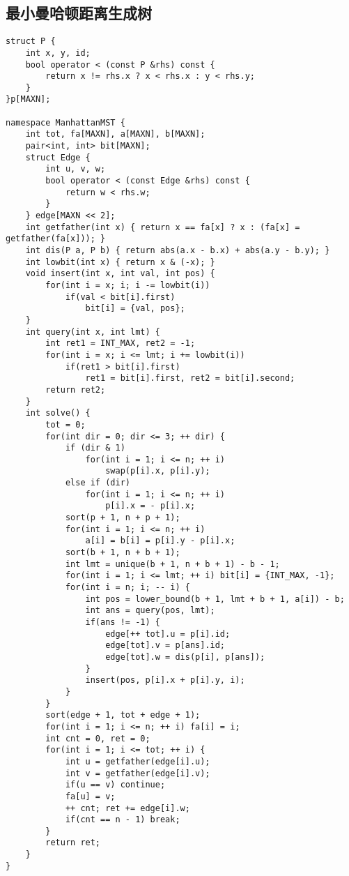 \subsection{最小曼哈顿距离生成树}

\begin{verbatim}
struct P {
    int x, y, id;
    bool operator < (const P &rhs) const {
        return x != rhs.x ? x < rhs.x : y < rhs.y;
    }
}p[MAXN];

namespace ManhattanMST {
    int tot, fa[MAXN], a[MAXN], b[MAXN];
    pair<int, int> bit[MAXN];
    struct Edge {
        int u, v, w;
        bool operator < (const Edge &rhs) const {
            return w < rhs.w;
        }
    } edge[MAXN << 2];
    int getfather(int x) { return x == fa[x] ? x : (fa[x] = getfather(fa[x])); }
    int dis(P a, P b) { return abs(a.x - b.x) + abs(a.y - b.y); }
    int lowbit(int x) { return x & (-x); }
    void insert(int x, int val, int pos) {
        for(int i = x; i; i -= lowbit(i))
            if(val < bit[i].first)
                bit[i] = {val, pos};
    }
    int query(int x, int lmt) {
        int ret1 = INT_MAX, ret2 = -1;
        for(int i = x; i <= lmt; i += lowbit(i))
            if(ret1 > bit[i].first)
                ret1 = bit[i].first, ret2 = bit[i].second;
        return ret2;
    }
    int solve() {
        tot = 0;
        for(int dir = 0; dir <= 3; ++ dir) {
            if (dir & 1)
                for(int i = 1; i <= n; ++ i)
                    swap(p[i].x, p[i].y);
            else if (dir)
                for(int i = 1; i <= n; ++ i)
                    p[i].x = - p[i].x;
            sort(p + 1, n + p + 1);
            for(int i = 1; i <= n; ++ i)
                a[i] = b[i] = p[i].y - p[i].x;
            sort(b + 1, n + b + 1);
            int lmt = unique(b + 1, n + b + 1) - b - 1;
            for(int i = 1; i <= lmt; ++ i) bit[i] = {INT_MAX, -1};
            for(int i = n; i; -- i) {
                int pos = lower_bound(b + 1, lmt + b + 1, a[i]) - b;
                int ans = query(pos, lmt);
                if(ans != -1) {
                    edge[++ tot].u = p[i].id;
                    edge[tot].v = p[ans].id;
                    edge[tot].w = dis(p[i], p[ans]);
                }
                insert(pos, p[i].x + p[i].y, i);
            }
        }
        sort(edge + 1, tot + edge + 1);
        for(int i = 1; i <= n; ++ i) fa[i] = i;
        int cnt = 0, ret = 0;
        for(int i = 1; i <= tot; ++ i) {
            int u = getfather(edge[i].u);
            int v = getfather(edge[i].v);
            if(u == v) continue;
            fa[u] = v;
            ++ cnt; ret += edge[i].w;
            if(cnt == n - 1) break;
        }
        return ret;
    }
}
\end{verbatim}